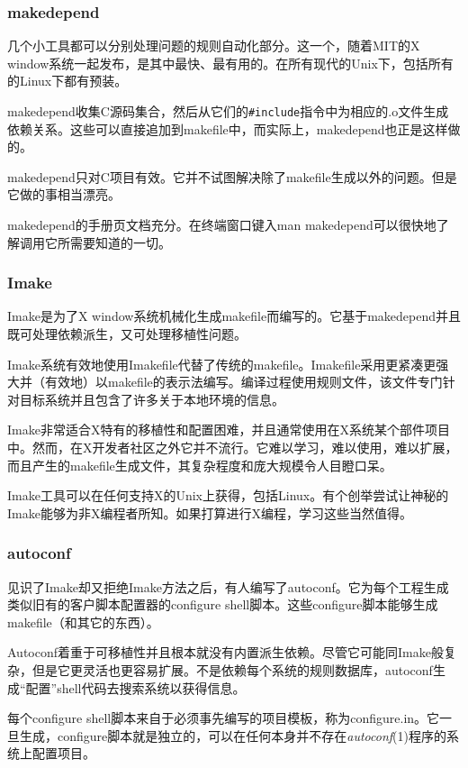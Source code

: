 \documentclass[12pt,oneside]{book}
\begin{document}
\begin{common-format}
\subsubsection{makedepend}
几个小工具都可以分别处理问题的规则自动化部分。这一个，随着MIT的X window系统一起发布，是其中最快、最有用的。在所有现代的Unix下，包括所有的Linux下都有预装。

makedepend收集C源码集合，然后从它们的\verb+#include+指令中为相应的.o文件生成依赖关系。这些可以直接追加到makefile中，而实际上，makedepend也正是这样做的。

makedepend只对C项目有效。它并不试图解决除了makefile生成以外的问题。但是它做的事相当漂亮。

makedepend的手册页文档充分。在终端窗口键入man makedepend可以很快地了解调用它所需要知道的一切。

\subsubsection{Imake}
Imake是为了X window系统机械化生成makefile而编写的。它基于makedepend并且既可处理依赖派生，又可处理移植性问题。

Imake系统有效地使用Imakefile代替了传统的makefile。Imakefile采用更紧凑更强大并（有效地）以makefile的表示法编写。编译过程使用规则文件，该文件专门针对目标系统并且包含了许多关于本地环境的信息。

Imake非常适合X特有的移植性和配置困难，并且通常使用在X系统某个部件项目中。然而，在X开发者社区之外它并不流行。它难以学习，难以使用，难以扩展，而且产生的makefile生成文件，其复杂程度和庞大规模令人目瞪口呆。

Imake工具可以在任何支持X的Unix上获得，包括Linux。有个创举\cite{DuBois}尝试让神秘的Imake能够为非X编程者所知。如果打算进行X编程，学习这些当然值得。

\subsubsection{autoconf}
见识了Imake却又拒绝Imake方法之后，有人编写了autoconf。它为每个工程生成类似旧有的客户脚本配置器的configure shell脚本。这些configure脚本能够生成makefile（和其它的东西）。

Autoconf着重于可移植性并且根本就没有内置派生依赖。尽管它可能同Imake般复杂，但是它更灵活也更容易扩展。不是依赖每个系统的规则数据库，autoconf生成“配置”shell代码去搜索系统以获得信息。

每个configure shell脚本来自于必须事先编写的项目模板，称为configure.in。它一旦生成，configure脚本就是独立的，可以在任何本身并不存在\textit{autoconf}(1)程序的系统上配置项目。


\end{common-format}
\end{document}
